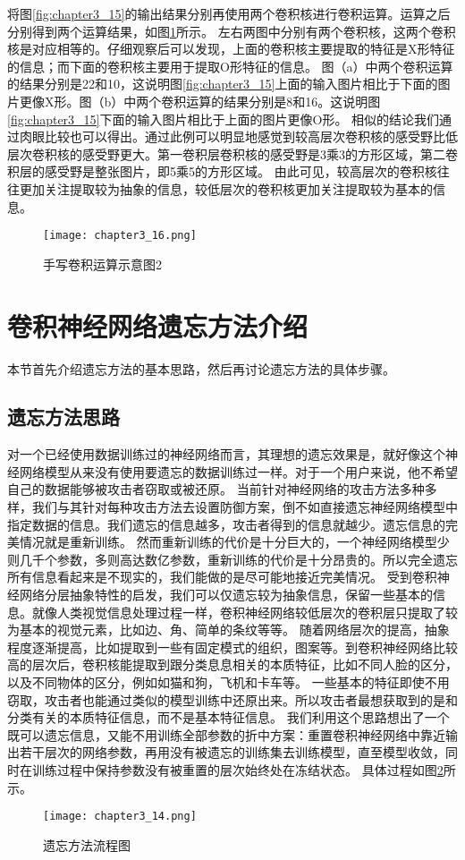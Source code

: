 将图\ref{fig:chapter3_15}的输出结果分别再使用两个卷积核进行卷积运算。运算之后分别得到两个运算结果，如图\ref{fig:chapter3_16}所示。
左右两图中分别有两个卷积核，这两个卷积核是对应相等的。仔细观察后可以发现，上面的卷积核主要提取的特征是X形特征的信息；而下面的卷积核主要用于提取O形特征的信息。
图（a）中两个卷积运算的结果分别是22和10，这说明图\ref{fig:chapter3_15}上面的输入图片相比于下面的图片更像X形。图（b）中两个卷积运算的结果分别是8和16。这说明图\ref{fig:chapter3_15}下面的输入图片相比于上面的图片更像O形。
相似的结论我们通过肉眼比较也可以得出。通过此例可以明显地感觉到较高层次卷积核的感受野比低层次卷积核的感受野更大。第一卷积层卷积核的感受野是3乘3的方形区域，第二卷积层的感受野是整张图片，即5乘5的方形区域。
由此可见，较高层次的卷积核往往更加关注提取较为抽象的信息，较低层次的卷积核更加关注提取较为基本的信息。
\begin{figure}
    \centering
    \texttt{[image: chapter3\_16.png]}
    \caption{手写卷积运算示意图2}
    \label{fig:chapter3_16}
\end{figure}

\section{卷积神经网络遗忘方法介绍}
本节首先介绍遗忘方法的基本思路，然后再讨论遗忘方法的具体步骤。
\subsection{遗忘方法思路}
对一个已经使用数据训练过的神经网络而言，其理想的遗忘效果是，就好像这个神经网络模型从来没有使用要遗忘的数据训练过一样。对于一个用户来说，他不希望自己的数据能够被攻击者窃取或被还原。
当前针对神经网络的攻击方法多种多样，我们与其针对每种攻击方法去设置防御方案，倒不如直接遗忘神经网络模型中指定数据的信息。我们遗忘的信息越多，攻击者得到的信息就越少。遗忘信息的完美情况就是重新训练。
然而重新训练的代价是十分巨大的，一个神经网络模型少则几千个参数，多则高达数亿参数，重新训练的代价是十分昂贵的。所以完全遗忘所有信息看起来是不现实的，我们能做的是尽可能地接近完美情况。
受到卷积神经网络分层抽象特性的启发，我们可以仅遗忘较为抽象信息，保留一些基本的信息。就像人类视觉信息处理过程一样，卷积神经网络较低层次的卷积层只提取了较为基本的视觉元素，比如边、角、简单的条纹等等。
随着网络层次的提高，抽象程度逐渐提高，比如提取到一些有固定模式的组织，图案等。到卷积神经网络比较高的层次后，卷积核能提取到跟分类息息相关的本质特征，比如不同人脸的区分，以及不同物体的区分，例如如猫和狗，飞机和卡车等。
一些基本的特征即使不用窃取，攻击者也能通过类似的模型训练中还原出来。所以攻击者最想获取到的是和分类有关的本质特征信息，而不是基本特征信息。
我们利用这个思路想出了一个既可以遗忘信息，又能不用训练全部参数的折中方案：重置卷积神经网络中靠近输出若干层次的网络参数，再用没有被遗忘的训练集去训练模型，直至模型收敛，同时在训练过程中保持参数没有被重置的层次始终处在冻结状态。
具体过程如图\ref{fig:chapter3_14}所示。
\begin{figure}
    \centering
    \texttt{[image: chapter3\_14.png]}
    \caption{遗忘方法流程图}
    \label{fig:chapter3_14}
\end{figure}

